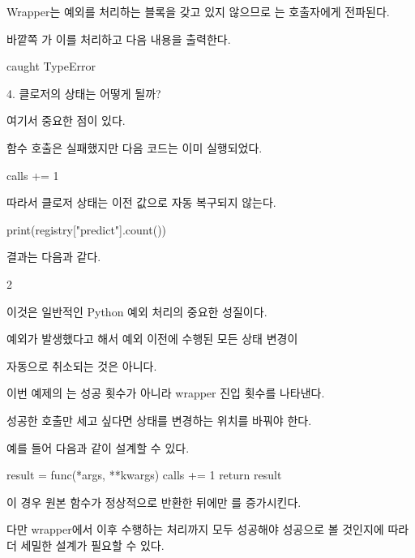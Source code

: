 Wrapper는 예외를 처리하는  블록을 갖고 있지 않으므로 는 호출자에게 전파된다.

바깥쪽 가 이를 처리하고 다음 내용을 출력한다.

\begin{dhkzsh}
caught TypeError
\end{dhkzsh}

\begin{dhknote}
\begin{dhksmry}[centered]
4. 클로저의 상태는 어떻게 될까?
\end{dhksmry}
\end{dhknote}

여기서 중요한 점이 있다.

함수 호출은 실패했지만 다음 코드는 이미 실행되었다.

\begin{dhkcode}
calls += 1
\end{dhkcode}

따라서 클로저 상태는 이전 값으로 자동 복구되지 않는다.

\begin{dhkcode}
print(registry["predict"].count())
\end{dhkcode}

결과는 다음과 같다.

\begin{dhkzsh}
2
\end{dhkzsh}

이것은 일반적인 Python 예외 처리의 중요한 성질이다.

\begin{dhksmry}[centered]
예외가 발생했다고 해서 예외 이전에 수행된 모든 상태 변경이

자동으로 취소되는 것은 아니다.
\end{dhksmry}

이번 예제의 는 성공 횟수가 아니라 wrapper 진입 횟수를 나타낸다.

성공한 호출만 세고 싶다면 상태를 변경하는 위치를 바꿔야 한다.

예를 들어 다음과 같이 설계할 수 있다.

\begin{dhkcode}
result = func(*args, **kwargs)
calls += 1
return result
\end{dhkcode}

이 경우 원본 함수가 정상적으로 반환한 뒤에만 를 증가시킨다.

다만 wrapper에서 이후 수행하는 처리까지 모두 성공해야 성공으로 볼 것인지에 따라 더 세밀한 설계가 필요할 수 있다.

